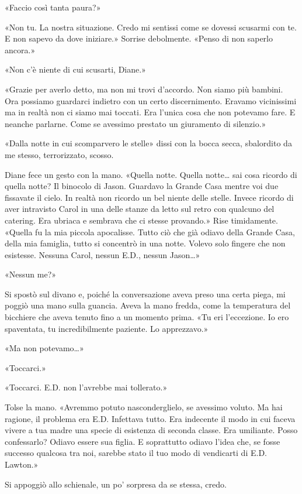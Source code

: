 «Faccio così tanta paura?»

«Non tu. La nostra situazione. Credo mi sentissi come se dovessi
scusarmi con te. E non sapevo da dove iniziare.» Sorrise debolmente.
«Penso di non saperlo ancora.»

«Non c'è niente di cui scusarti, Diane.»

«Grazie per averlo detto, ma non mi trovi d'accordo. Non siamo più
bambini. Ora possiamo guardarci indietro con un certo discernimento.
Eravamo vicinissimi ma in realtà non ci siamo mai toccati. Era l'unica
cosa che non potevamo fare. E neanche parlarne. Come se avessimo
prestato un giuramento di silenzio.»

«Dalla notte in cui scomparvero le stelle» dissi con la bocca secca,
sbalordito da me stesso, terrorizzato, scosso.

Diane fece un gesto con la mano. «Quella notte. Quella notte\ldots{} sai
cosa ricordo di quella notte? Il binocolo di Jason. Guardavo la Grande
Casa mentre voi due fissavate il cielo. In realtà non ricordo un bel
niente delle stelle. Invece ricordo di aver intravisto Carol in una
delle stanze da letto sul retro con qualcuno del catering. Era ubriaca e
sembrava che ci stesse provando.» Rise timidamente. «Quella fu la mia
piccola apocalisse. Tutto ciò che già odiavo della Grande Casa, della
mia famiglia, tutto si concentrò in una notte. Volevo solo fingere che
non esistesse. Nessuna Carol, nessun E.D., nessun Jason\ldots»

«Nessun me?»

Si spostò sul divano e, poiché la conversazione aveva preso una certa
piega, mi poggiò una mano sulla guancia. Aveva la mano fredda, come la
temperatura del bicchiere che aveva tenuto fino a un momento prima. «Tu
eri l'eccezione. Io ero spaventata, tu incredibilmente paziente. Lo
apprezzavo.»

«Ma non potevamo\ldots»

«Toccarci.»

«Toccarci. E.D. non l'avrebbe mai tollerato.»

Tolse la mano. «Avremmo potuto nasconderglielo, se avessimo voluto. Ma
hai ragione, il problema era E.D. Infettava tutto. Era indecente il modo
in cui faceva vivere a tua madre una specie di esistenza di seconda
classe. Era umiliante. Posso confessarlo? Odiavo essere sua figlia. E
soprattutto odiavo l'idea che, se fosse successo qualcosa tra noi,
sarebbe stato il tuo modo di vendicarti di E.D. Lawton.»

Si appoggiò allo schienale, un po' sorpresa da se stessa, credo.

